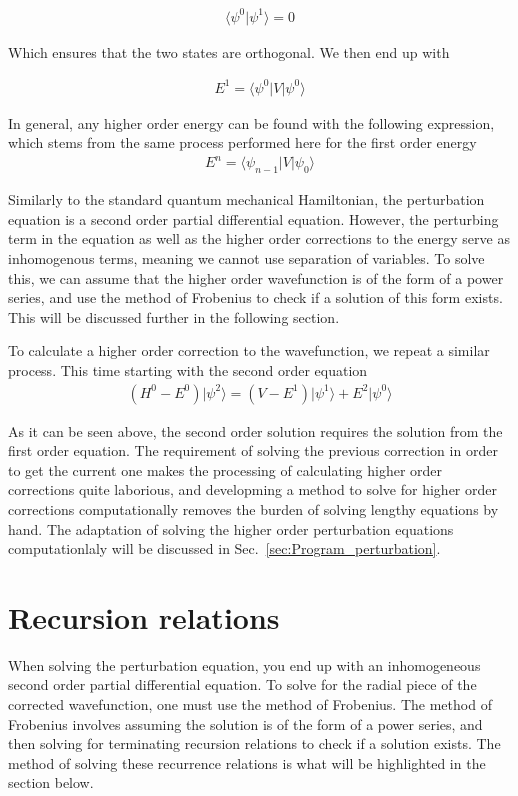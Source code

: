         \begin{align}
            \langle \psi^0 \vert \psi^1 \rangle = 0
        \end{align}
        
        Which ensures that the two states are orthogonal. We then end up with

        \begin{align}
            E^1 = \langle \psi^0 \vert V \vert \psi^0 \rangle
        \end{align}

        In general, any higher order energy can be found with the following expression, which stems from the same process performed here for the first order energy
        \begin{align}
            E^n = \langle \psi_{n-1} \vert V \vert \psi_0 \rangle
        \end{align}

        Similarly to the standard quantum mechanical Hamiltonian, the perturbation equation is a second order partial differential equation. However, the perturbing term in the equation as well as the higher order corrections to the energy serve as inhomogenous terms, meaning we cannot use separation of variables. To solve this, we can assume that the higher order wavefunction is of the form of a power series, and use the method of Frobenius to check if a solution of this form exists. This will be discussed further in the following section. 

        To calculate a higher order correction to the wavefunction, we repeat a similar process. This time starting with the second order equation
        \begin{align}
            \left( H^0 - E^0 \right) \vert \psi^2 \rangle = \left(V - E^1 \right) \vert \psi^1 \rangle + E^2 \vert \psi^0 \rangle
        \end{align}

        As it can be seen above, the second order solution requires the solution from the first order equation. The requirement of solving the previous correction in order to get the current one makes the processing of calculating higher order corrections quite laborious, and developming a method to solve for higher order corrections computationally removes the burden of solving lengthy equations by hand. The adaptation of solving the higher order perturbation equations computationlaly will be discussed in Sec.~\ref{sec:Program_perturbation}.

    \section{Recursion relations} \label{sec:Recursion_Relations}
        When solving the perturbation equation, you end up with an inhomogeneous second order partial differential equation. To solve for the radial piece of the corrected wavefunction, one must use the method of Frobenius. The method of Frobenius involves assuming the solution is of the form of a power series, and then solving for terminating recursion relations to check if a solution exists. The method of solving these recurrence relations is what will be highlighted in the section below. 

